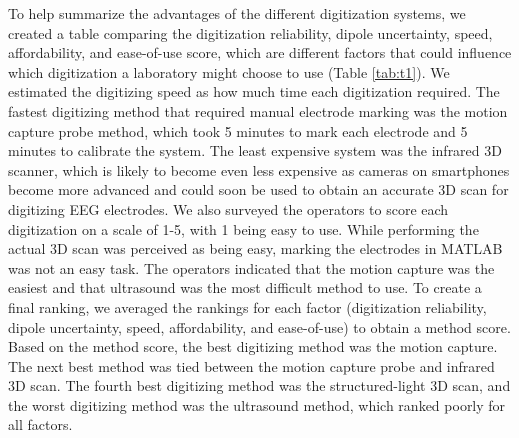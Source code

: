 \documentclass{UCF_ETD}
\begin{document}
To help summarize the advantages of the different digitization systems, we created a table comparing the digitization reliability, dipole uncertainty, speed, affordability, and ease-of-use score, which are different factors that could influence which digitization a laboratory might choose to use (Table \ref{tab:t1}). We estimated the digitizing speed as how much time each digitization required. The fastest digitizing method that required manual electrode marking was the motion capture probe method, which took 5 minutes to mark each electrode and 5 minutes to calibrate the system. The least expensive system was the infrared 3D scanner, which is likely to become even less expensive as cameras on smartphones become more advanced and could soon be used to obtain an accurate 3D scan for digitizing EEG electrodes. We also surveyed the operators to score each digitization on a scale of 1-5, with 1 being easy to use. While performing the actual 3D scan was perceived as being easy, marking the electrodes in MATLAB was not an easy task. The operators indicated that the motion capture was the easiest and that ultrasound was the most difficult method to use. To create a final ranking, we averaged the rankings for each factor (digitization reliability, dipole uncertainty, speed, affordability, and ease-of-use) to obtain a method score. Based on the method score, the best digitizing method was the motion capture. The next best method was tied between the motion capture probe and infrared 3D scan. The fourth best digitizing method was the structured-light 3D scan, and the worst digitizing method was the ultrasound method, which ranked poorly for all factors.
\end{document}
